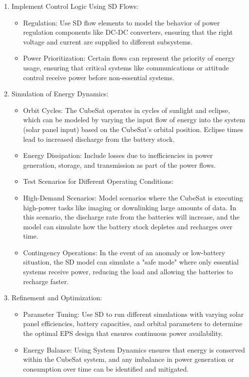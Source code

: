 \documentclass[11pt, a4paper]{article}
\theoremstyle{definition}
\theoremstyle{plain}
\theoremstyle{plain}
\theoremstyle{remark}
\theoremstyle{remark}
\theoremstyle{remark}
\begin{document}
\begin{enumerate}
\item  Implement Control Logic Using SD Flows:
\begin{itemize}
	\item  Regulation: Use SD flow elements to model the behavior of power regulation components like DC-DC converters, ensuring that the right voltage and current are supplied to different subsystems.
	\item  Power Prioritization: Certain flows can represent the priority of energy usage, ensuring that critical systems like communications or attitude control receive power before non-essential systems.
\end{itemize}
\item  Simulation of Energy Dynamics:
\begin{itemize}
	\item  Orbit Cycles: The CubeSat operates in cycles of sunlight and eclipse, which can be modeled by varying the input flow of energy into the system (solar panel input) based on the CubeSat's orbital position. Eclipse times lead to increased discharge from the battery stock.
	\item  Energy Dissipation: Include losses due to inefficiencies in power generation, storage, and transmission as part of the power flows.
	\item  Test Scenarios for Different Operating Conditions:
\end{itemize}
\begin{itemize}
	\item  High-Demand Scenarios: Model scenarios where the CubeSat is executing high-power tasks like imaging or downlinking large amounts of data. In this scenario, the discharge rate from the batteries will increase, and the model can simulate how the battery stock depletes and recharges over time.
	\item  Contingency Operations: In the event of an anomaly or low-battery situation, the SD model can simulate a "safe mode" where only essential systems receive power, reducing the load and allowing the batteries to recharge faster.
\end{itemize}
\item  Refinement and Optimization:
\begin{itemize}
	\item  Parameter Tuning: Use SD to run different simulations with varying solar panel efficiencies, battery capacities, and orbital parameters to determine the optimal EPS design that ensures continuous power availability.
	\item  Energy Balance: Using System Dynamics ensures that energy is conserved within the CubeSat system, and any imbalance in power generation or consumption over time can be identified and mitigated.
\end{itemize}
\end{enumerate}
\end{document}
